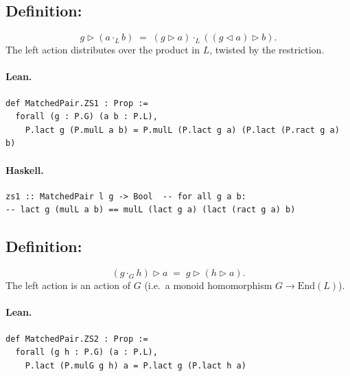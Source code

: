 \documentclass[11pt,a4paper]{article}
\begin{document}
\subsection{Definition: }

\begin{defn}
\[
  g \triangleright (a \cdot_L b)
  \;=\;
  (g \triangleright a) \cdot_L ((g \triangleleft a) \triangleright b).
\]
The left action distributes over the product in $L$, twisted by the restriction.
\end{defn}

\paragraph{Lean.}
\begin{lstlisting}[style=lean]
def MatchedPair.ZS1 : Prop :=
  forall (g : P.G) (a b : P.L),
    P.lact g (P.mulL a b) = P.mulL (P.lact g a) (P.lact (P.ract g a) b)
\end{lstlisting}

\paragraph{Haskell.}
\begin{lstlisting}[style=haskell]
zs1 :: MatchedPair l g -> Bool  -- for all g a b:
-- lact g (mulL a b) == mulL (lact g a) (lact (ract g a) b)
\end{lstlisting}


\subsection{Definition: }

\begin{defn}
\[
  (g \cdot_G h) \triangleright a
  \;=\;
  g \triangleright (h \triangleright a).
\]
The left action is an action of $G$ (i.e.\ a monoid homomorphism $G \to \mathrm{End}(L)$).
\end{defn}

\paragraph{Lean.}
\begin{lstlisting}[style=lean]
def MatchedPair.ZS2 : Prop :=
  forall (g h : P.G) (a : P.L),
    P.lact (P.mulG g h) a = P.lact g (P.lact h a)
\end{lstlisting}
\end{document}
